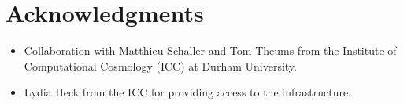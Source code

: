 \documentclass[final]{siamltex}
\begin{document}
\section*{Acknowledgments}

\begin{itemize}

    \item Collaboration with Matthieu Schaller and Tom Theums from the
        Institute of Computational Cosmology (ICC) at Durham University.
        
    \item Lydia Heck from the ICC for providing access to the infrastructure.

\end{itemize}


\nopagebreak

\end{document}

